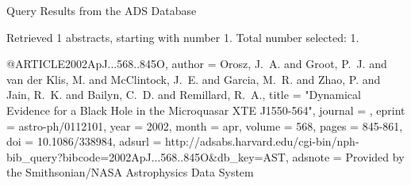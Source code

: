 Query Results from the ADS Database


Retrieved 1 abstracts, starting with number 1.  Total number selected: 1.

@ARTICLE{2002ApJ...568..845O,
   author = {{Orosz}, J.~A. and {Groot}, P.~J. and {van der Klis}, M. and 
	{McClintock}, J.~E. and {Garcia}, M.~R. and {Zhao}, P. and {Jain}, R.~K. and 
	{Bailyn}, C.~D. and {Remillard}, R.~A.},
    title = "{Dynamical Evidence for a Black Hole in the Microquasar XTE J1550-564}",
  journal = {\apj},
   eprint = {astro-ph/0112101},
     year = 2002,
    month = apr,
   volume = 568,
    pages = {845-861},
      doi = {10.1086/338984},
   adsurl = {http://adsabs.harvard.edu/cgi-bin/nph-bib_query?bibcode=2002ApJ...568..845O&db_key=AST},
  adsnote = {Provided by the Smithsonian/NASA Astrophysics Data System}
}



